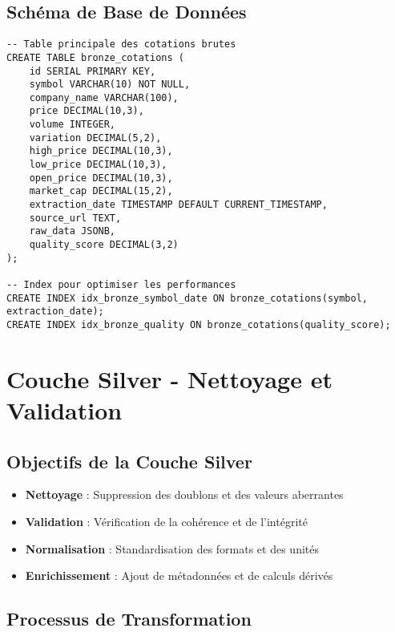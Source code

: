 \subsection{Schéma de Base de Données}

\begin{verbatim}
-- Table principale des cotations brutes
CREATE TABLE bronze_cotations (
    id SERIAL PRIMARY KEY,
    symbol VARCHAR(10) NOT NULL,
    company_name VARCHAR(100),
    price DECIMAL(10,3),
    volume INTEGER,
    variation DECIMAL(5,2),
    high_price DECIMAL(10,3),
    low_price DECIMAL(10,3),
    open_price DECIMAL(10,3),
    market_cap DECIMAL(15,2),
    extraction_date TIMESTAMP DEFAULT CURRENT_TIMESTAMP,
    source_url TEXT,
    raw_data JSONB,
    quality_score DECIMAL(3,2)
);

-- Index pour optimiser les performances
CREATE INDEX idx_bronze_symbol_date ON bronze_cotations(symbol, extraction_date);
CREATE INDEX idx_bronze_quality ON bronze_cotations(quality_score);
\end{verbatim}

\section{Couche Silver - Nettoyage et Validation}

\subsection{Objectifs de la Couche Silver}

\begin{itemize}
    \item \textbf{Nettoyage} : Suppression des doublons et des valeurs aberrantes
    \item \textbf{Validation} : Vérification de la cohérence et de l'intégrité
    \item \textbf{Normalisation} : Standardisation des formats et des unités
    \item \textbf{Enrichissement} : Ajout de métadonnées et de calculs dérivés
\end{itemize}

\subsection{Processus de Transformation}


